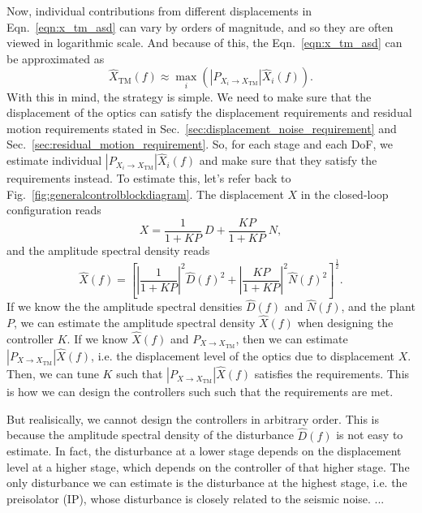 Now, individual contributions from different displacements in Eqn.~\eqref{eqn:x_tm_asd} can vary by orders of magnitude, and so they are often viewed in logarithmic scale.
And because of this, the Eqn.~\eqref{eqn:x_tm_asd} can be approximated as
\begin{equation}
	\hat{X}_\mathrm{TM}(f) \approx \max_i \left(\left\lvert P_{X_i\to X_\mathrm{TM}} \right\rvert \hat{X}_i(f)\right).
\end{equation}
With this in mind, the strategy is simple.
We need to make sure that the displacement of the optics can satisfy the displacement requirements and residual motion requirements stated in Sec.~\ref{sec:displacement_noise_requirement} and Sec.~\ref{sec:residual_motion_requirement}.
So, for each stage and each DoF, we estimate individual $\left\lvert P_{X_i\to X_\mathrm{TM}}\right\rvert \hat{X}_i(f)$ and make sure that they satisfy the requirements instead.
To estimate this, let's refer back to Fig.~\ref{fig:generalcontrolblockdiagram}.
The displacement $X$ in the closed-loop configuration reads
\begin{equation}
	X = \frac{1}{1+KP}\ D + \frac{KP}{1+KP}\ N,
\end{equation}
and the amplitude spectral density reads
\begin{equation}
	\hat{X}(f) = \left[\left\lvert\frac{1}{1+KP}\right\rvert^2\hat{D}(f)^2 + \left\lvert\frac{KP}{1+KP}\right\rvert^2\hat{N}(f)^2\right]^\frac{1}{2}.
\end{equation}
If we know the the amplitude spectral densities $\hat{D}(f)$ and $\hat{N}(f)$, and the plant $P$, we can estimate the amplitude spectral density $\hat{X}(f)$ when designing the controller $K$.
If we know $\hat{X}(f)$ and $P_{X\to X_\mathrm{TM}}$, then we can estimate $\left\lvert P_{X\to X_\mathrm{TM}}\right\rvert \hat{X}(f)$, i.e. the displacement level of the optics due to displacement $X$.
Then, we can tune $K$ such that $\left\lvert P_{X\to X_\mathrm{TM}}\right\rvert \hat{X}(f)$ satisfies the requirements.
This is how we can design the controllers such such that the requirements are met.

But realisically, we cannot design the controllers in arbitrary order.
This is because the amplitude spectral density of the disturbance $\hat{D}(f)$ is not easy to estimate.
In fact, the disturbance at a lower stage depends on the displacement level at a higher stage, which depends on the controller of that higher stage.
The only disturbance we can estimate is the disturbance at the highest stage, i.e. the preisolator (IP), whose disturbance is closely related to the seismic noise.
...






